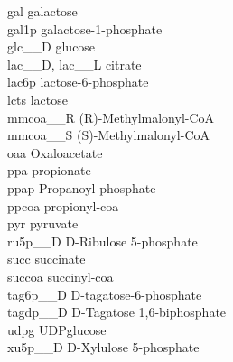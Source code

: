 gal \hspace{.5em} galactose \\
gal1p \hspace{.5em} galactose-1-phosphate \\
 glc\_\_D \hspace{.5em} glucose\\
 lac\_\_D, lac\_\_L \hspace{.5em} citrate \\
lac6p \hspace{.5em} lactose-6-phosphate \\
lcts \hspace{.5em} lactose \\
mmcoa\_\_R \hspace{.5em} (R)-Methylmalonyl-CoA \\
mmcoa\_\_S \hspace{.5em} (S)-Methylmalonyl-CoA \\
oaa \hspace{.5em} Oxaloacetate \\
ppa \hspace{.5em} propionate \\
ppap \hspace{.5em} Propanoyl phosphate \\
ppcoa \hspace{.5em} propionyl-coa \\
pyr \hspace{.5em} pyruvate \\
ru5p\_\_D \hspace{.5em} D-Ribulose 5-phosphate \\
succ \hspace{.5em} succinate \\
succoa \hspace{.5em} succinyl-coa \\
tag6p\_\_D \hspace{.5em} D-tagatose-6-phosphate \\
tagdp\_\_D \hspace{.5em} D-Tagatose 1,6-biphosphate \\
udpg \hspace{.5em} UDPglucose \\
xu5p\_\_D \hspace{.5em} D-Xylulose 5-phosphate \\

\newpage
